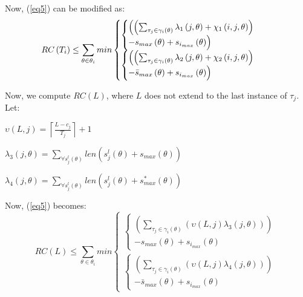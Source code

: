 \documentclass[letter]{sig-alternate}
\begin{document}
Now, (\ref{eq5}) can be modified as:
\begin{equation}
RC\left(T_{i}\right)\le \sum_{\theta\in\theta_{i}}min\begin{cases}
\begin{cases}
\Bigl(\left(\sum_{\tau_{j}\in\gamma_i\left(\theta\right)}\lambda_{1}\left(j,\theta\right)+\chi_{1}\left(i,j,\theta\right)\right)\\
-s_{max}\left(\theta\right)+s_{i_{max}}\left(\theta\right)\Bigr)\end{cases}\\
\begin{cases}
\Bigl(\left(\sum_{\tau_{j}\in\gamma_i\left(\theta\right)}\lambda_{2}\left(j,\theta\right)+\chi_{2}\left(i,j,\theta\right)\right)\\
-\bar{s}_{max}\left(\theta\right)+s_{i_{max}}\left(\theta\right)\Bigr)\end{cases}\end{cases}\label{eq15}\end{equation}



Now, we compute $RC(L)$, where $L$ does not extend to the last instance of $\tau_{j}$. Let:
\begin{compactitem}
\item $\upsilon\left(L,j\right)=\left\lceil\frac{L-c_{j}}{T_{j}}\right\rceil+1$
\item $\lambda_{3}\left(j,\theta\right)=\sum_{\forall s_{j}^{l}\left(\theta\right)}len\left(s_{j}^{l}\left(\theta\right)+s_{max}\left(\theta\right)\right)$
\item $\lambda_{4}\left(j,\theta\right)=\sum_{\forall s_{j}^{l}\left(\theta\right)}len\left(s_{j}^{l}\left(\theta\right)+s_{max}^{*}\left(\theta\right)\right)$
\end{compactitem}
Now, (\ref{eq5}) becomes: 
\begin{equation}
RC\left(L\right)\le \sum_{\theta\in\theta_{i}}min\begin{cases}
\begin{cases}
\left(\sum_{\tau_{j}\in\gamma_i\left(\theta\right)}\left(\upsilon\left(L,j\right)\lambda_{3}\left(j,\theta\right)\right)\right)\\
-s_{max}\left(\theta\right)+s_{i_{max}}\left(\theta\right)\end{cases}\\
\begin{cases}
\left(\sum_{\tau_{j}\in\gamma_i\left(\theta\right)}\left(\upsilon\left(L,j\right)\lambda_{4}\left(j,\theta\right)\right)\right)\\
-\bar{s}_{max}\left(\theta\right)+s_{i_{max}}\left(\theta\right)\end{cases}\end{cases}\label{eq16}\end{equation}
\end{document}
